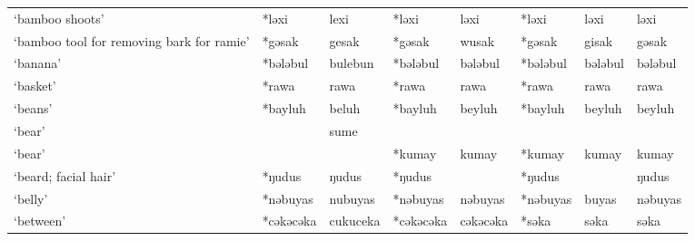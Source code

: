 \begin{landscape}
\begin{longtable}[c]{@{}p{3cm}<{\raggedright}p{2.75cm}<{\raggedright}p{2.75cm}<{\raggedright}p{2.75cm}<{\raggedright}p{2.75cm}<{\raggedright}p{2.75cm}<{\raggedright}p{2.75cm}<{\raggedright}p{2.75cm}<{\raggedright}@{}}
`bamboo shoots'                                      & *ləxi              & lexi                           & *ləxi              & ləxi                       & *ləxi            & ləxi                     & ləxi                              \\
`bamboo tool for removing bark for ramie'            & *gəsak             & gesak                          & *gəsak             & wusak                      & *gəsak           & gisak                    & gəsak                             \\
`banana'                                             & *bələbul           & bulebun                        & *bələbul           & bələbul                    & *bələbul         & bələbul                  & bələbul                           \\
`basket'                                             & *rawa              & rawa                           & *rawa              & rawa                       & *rawa            & rawa                     & rawa                              \\
`beans'                                              & *bayluh            & beluh                          & *bayluh            & beyluh                     & *bayluh          & beyluh                   & beyluh                            \\
`bear'                                               &                    & sume                           &                    &                            &                  &                          &                                   \\
`bear'                                               &                    &                                & *kumay             & kumay                      & *kumay           & kumay                    & kumay                             \\
`beard; facial hair'                                 & *ŋudus             & ŋudus                          & *ŋudus             &                            & *ŋudus           &                          & ŋudus                             \\
`belly'                                              & *nəbuyas           & nubuyas                        & *nəbuyas           & nəbuyas                    & *nəbuyas         & buyas                    & nəbuyas                           \\
`between'                                            & *cəkəcəka          & cukuceka                       & *cəkəcəka          & cəkəcəka                   & *səka            & səka                     & səka                              \\

\end{longtable}
\end{landscape}
